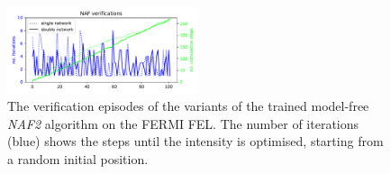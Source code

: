 \documentclass[
reprint,
amsmath,amssymb,amsfonts,clevref,
aps,
prstab,
]{revtex4-2}
\begin{document}
	\begin{figure}
		\centering
		\includegraphics*[width=0.5\textwidth]{Figures/FERMI_all_experiments_NAF_verification_episodes.pdf}
		\caption{The verification episodes of the variants of the trained model-free \emph{NAF2} algorithm on the FERMI FEL. The number of iterations (blue) shows the steps until the intensity is optimised, starting from a random initial position.}
		\label{fig:NAF_verification}
	\end{figure}
	
\end{document}
